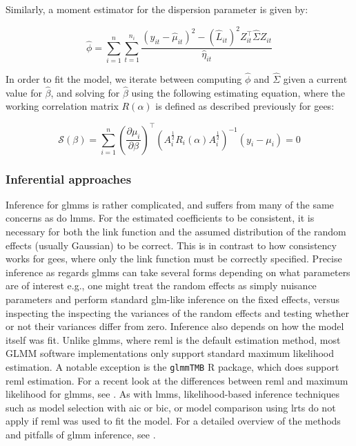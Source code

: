 \documentclass{report}
\begin{document}
Similarly, a moment estimator for the dispersion parameter is given by:

\begin{equation}\label{eq:glm-glmm-phi-estimator}
    \hat{\phi} = \sum_{i=1}^n \sum_{t=1}^{n_i} \frac{\left(y_{it} - \hat{\mu}_{it}\right)^2 - \left(\hat{L}_{it}\right)^2Z_{it}^\intercal \hat{\Sigma} Z_{it}}{\hat{\eta}_{it}}
\end{equation}

In order to fit the model, we iterate between computing $\hat{\phi}$ and $\hat{\Sigma}$ given a current value for $\hat{\beta}$, and solving for $\hat{\beta}$ using the following estimating equation, where the working correlation matrix $R(\alpha)$ is defined as described previously for \glspl{gee}:

\begin{equation}\label{eq:glm-glmm-beta-est-equation}
    \mathcal{S}(\beta) = \sum_{i=1}^n \left(\frac{\partial\mu_i}{\partial\beta}\right)^\intercal \left(A_i^{\frac{1}{2}} R_i(\alpha) A_i^{\frac{1}{2}}\right)^{-1} (y_i - \mu_i) = 0
\end{equation}

\subsubsection{Inferential approaches}

Inference for \glspl{glmm} is rather complicated, and suffers from many of the same concerns as do \glspl{lmm}. For the estimated coefficients to be consistent, it is necessary for both the link function and the assumed distribution of the random effects (usually Gaussian) to be correct. This is in contrast to how consistency works for \glspl{gee}, where only the link function must be correctly specified. Precise inference as regards \glspl{glmm} can take several forms depending on what parameters are of interest e.g., one might treat the random effects as simply nuisance parameters and perform standard \gls{glm}-like inference on the fixed effects, versus inspecting the inspecting the variances of the random effects and testing whether or not their variances differ from zero. Inference also depends on how the model itself was fit. Unlike \glspl{glmm}, where \gls{reml} is the default estimation method, most GLMM software implementations only support standard maximum likelihood estimation. A notable exception is the \texttt{glmmTMB} R package, which does support \gls{reml} estimation. For a recent look at the differences between \gls{reml} and maximum likelihood for \glspl{glmm}, see \cite{maestrini_restricted_2024}. As with \glspl{lmm}, likelihood-based inference techniques such as model selection with \gls{aic} or \gls{bic}, or model comparison using \glspl{lrt} do not apply if \gls{reml} was used to fit the model. For a detailed overview of the methods and pitfalls of \gls{glmm} inference, see \cite{bolker_glmm_2023}. 
\end{document}
